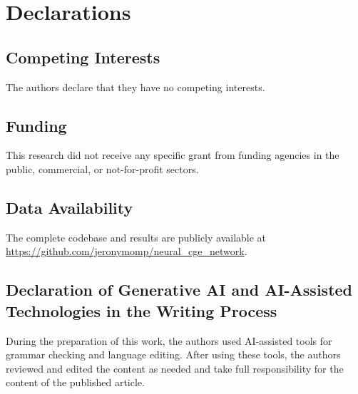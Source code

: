 \documentclass[preprint,12pt,authoryear]{sn-jnl}
\begin{document}

\section*{Declarations}

\subsection*{Competing Interests}

The authors declare that they have no competing interests.

\subsection*{Funding}

This research did not receive any specific grant from funding
agencies in the public, commercial, or not-for-profit sectors.

\subsection*{Data Availability}

The complete codebase and results are publicly available at
\url{https://github.com/jeronymomp/neural_cge_network}.

\subsection*{Declaration of Generative AI and AI-Assisted Technologies
in the Writing Process}

During the preparation of this work, the authors used AI-assisted
tools for grammar checking and language editing. After using these
tools, the authors reviewed and edited the content as needed and
take full responsibility for the content of the published article.






\onehalfspacing

\end{document}
